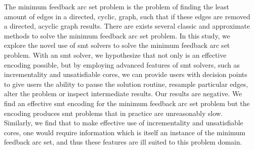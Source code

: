The minimum feedback arc set problem is the problem of finding the least amount
of edges in a directed, cyclic, graph, such that if these edges are removed a
directed, acyclic graph results. There are exists several classic and
approximate methods to solve the minimum feedback arc set problem. In this
study, we explore the novel use of \ac{smt} solvers to solve the minimum
feedback arc set problem. With an \ac{smt} solver, we hypothesize that not only
is an effective encoding possible, but by employing advanced features of
\ac{smt} solvers, such as incrementality and unsatisfiable cores, we can provide
users with decision points to give users the ability to pause the solution
routine, resample particular edges, alter the problem or inspect intermediate
results. Our results are negative. We find an effective \ac{smt} encoding for
the minimum feedback arc set problem but the encoding produces \ac{smt} problems
that in practice are unreasonably slow. Similarly, we find that to make
effective use of incrementality and unsatisfiable cores, one would require
information which is itself an instance of the minimum feedback arc set, and
thus these features are ill suited to this problem domain.


